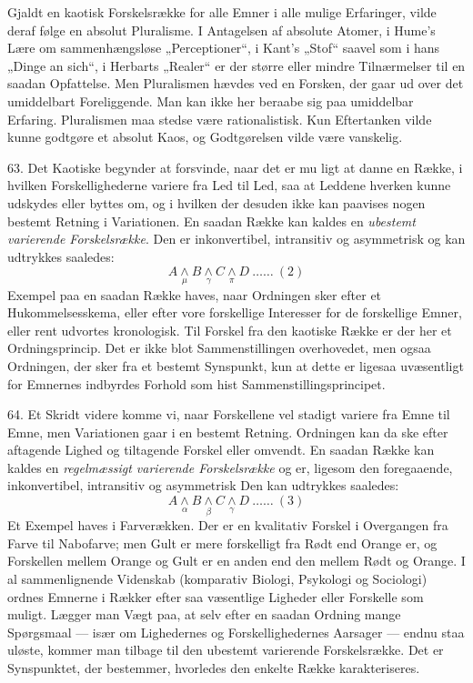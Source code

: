 \documentclass[12pt,a4paper]{book}
\newcommand{\opage}[1]{\marginnote{\footnotesize\textit{[#1]}}}
\newcommand{\apage}[1]{\marginnote{\footnotesize\textit{[#1]}}}
\begin{document}
Gjaldt en kaotisk Forskelsrække for alle Emner i alle mulige Erfaringer, vilde
deraf følge en absolut Pluralisme. I Antagelsen af absolute Atomer, i Hume's
Lære om sammenhængsløse „Perceptioner“, i Kant's „Stof“ saavel som i hans
„Dinge an sich“, i Herbarts „Realer“ er der større eller mindre Tilnærmelser
til en saadan Opfattelse. Men Pluralismen hævdes ved en Forsken, der gaar ud
over det umiddelbart Foreliggende. Man kan ikke her beraabe sig paa umiddelbar
Erfaring. Pluralismen maa stedse være rationalistisk. Kun Eftertanken vilde
kunne godtgøre et absolut Kaos, og Godtgørelsen vilde være vanskelig.

63. Det Kaotiske begynder at forsvinde, naar det er mu%
\opage{166}ligt at danne en Række, i
hvilken Forskellighederne variere fra Led til Led, saa at Leddene hverken kunne
udskydes eller byttes om, og i hvilken der desuden ikke kan paavises nogen
bestemt Retning i Variationen. En saadan Række kan kaldes en \emph{ubestemt
varierende Forskelsrække}. Den er inkonvertibel, intransitiv og asymmetrisk og
kan udtrykkes saaledes:
\[ A \underset{\mu}{\wedge} B \underset{\gamma}{\wedge} C \underset{\pi}{\wedge} D \ \ldots\ldots\ (2) \]
Exempel paa en saadan Række haves, naar Ordningen sker efter et
Hukommelsesskema, eller efter vore forskellige Interesser for de forskellige
Emner, eller rent udvortes kronologisk. Til Forskel fra den kaotiske Række er
der her et Ordningsprincip. Det er ikke blot Sammenstillingen overhovedet, men
ogsaa Ordningen, der sker fra et bestemt Synspunkt, kun at dette er ligesaa
uvæsentligt for Emnernes indbyrdes Forhold som hist Sammenstillingsprincipet.

64. Et Skridt videre komme vi, naar Forskellene vel stadigt variere fra Emne
til Emne, men Variationen gaar i en bestemt Retning. Ordningen kan da ske efter
aftagende Lighed og tiltagende Forskel eller omvendt. En saadan Række kan
kaldes en \emph{regelmæssigt varierende Forskelsrække} og er, ligesom den
foregaaende, inkonvertibel, intransitiv og asymmetrisk Den kan udtrykkes
saaledes:
\[ A \underset{\alpha}{\wedge} B \underset{\beta}{\wedge} C \underset{\gamma}{\wedge} D \ \ldots\ldots\ (3) \]
Et Exempel haves i Farverækken. Der er en kvalitativ Forskel i Overgangen fra
Farve til Nabofarve; men Gult er mere forskelligt fra Rødt end Orange er, og
Forskellen mellem Orange og Gult er en anden end den mellem Rødt og Orange. I
al sammenlignende Videnskab (komparativ Biologi, Psykologi og Sociologi) ordnes
Emnerne i Rækker efter saa væsentlige Ligheder eller Forskelle som muligt.
Lægger man Vægt paa, at selv efter en saadan Ordning mange Spørgsmaal --- især
om Lighedernes og Forskellighedernes Aarsager --- endnu staa uløste, kommer man
tilbage til den \apage{167} ubestemt varierende Forskelsrække. Det er Synspunktet, der
bestemmer, hvorledes den enkelte Række karakteriseres.
\end{document}
